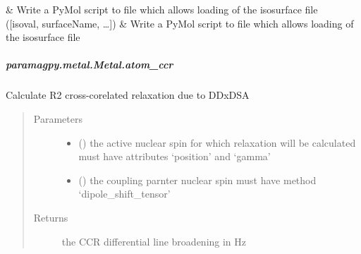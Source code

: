 \documentclass[a4paper,10pt,english]{sphinxmanual}
\begin{document}
\begin{fulllineitems}
\begin{fulllineitems}
\begin{savenotes}
\begin{longtable}{}
&
Write a PyMol script to file which allows loading of the isosurface file
\\
\hline
{\hyperref[\detokenize{reference/generated/paramagpy.metal.Metal.write_pymol_script:paramagpy.metal.Metal.write_pymol_script}]{}}({[}isoval, surfaceName, …{]})
&
Write a PyMol script to file which allows loading of the isosurface file
\\
\hline
\end{longtable}\sphinxatlongtableend\end{savenotes}


\subparagraph{paramagpy.metal.Metal.atom\_ccr}
\label{\detokenize{reference/generated/paramagpy.metal.Metal.atom_ccr:paramagpy-metal-metal-atom-ccr}}\label{\detokenize{reference/generated/paramagpy.metal.Metal.atom_ccr::doc}}

\begin{fulllineitems}
\label{\detokenize{reference/generated/paramagpy.metal.Metal.atom_ccr:paramagpy.metal.Metal.atom_ccr}}
Calculate R2 cross-corelated relaxation due to DDxDSA
\begin{quote}\begin{description}
\item[{Parameters}] \leavevmode\begin{itemize}
\item {} 
 ({\hyperref[\detokenize{reference/generated/paramagpy.protein.CustomAtom:paramagpy.protein.CustomAtom}]{}}) \textendash{} the active nuclear spin for which relaxation will be calculated
must have attributes ‘position’ and ‘gamma’

\item {} 
 ({\hyperref[\detokenize{reference/generated/paramagpy.protein.CustomAtom:paramagpy.protein.CustomAtom}]{}}) \textendash{} the coupling parnter nuclear spin
must have method ‘dipole\_shift\_tensor’

\end{itemize}

\item[{Returns}] \leavevmode
{} \textendash{} the CCR differential line broadening in Hz


\end{description}
\end{quote}
\end{fulllineitems}
\end{fulllineitems}
\end{fulllineitems}
\end{document}
